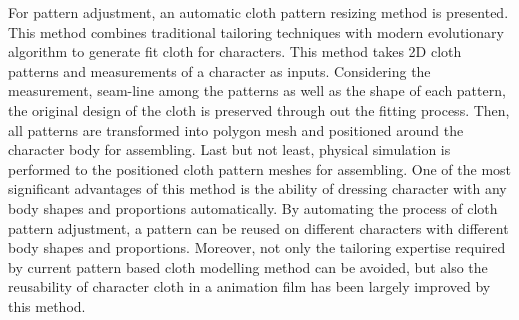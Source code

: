 For pattern adjustment, an automatic cloth pattern resizing method is presented. This method combines traditional tailoring techniques with modern evolutionary algorithm to generate fit cloth for characters. This method takes 2D cloth patterns and measurements of a character as inputs. Considering the measurement, seam-line among the patterns as well as the shape of each pattern, the original design of the cloth is preserved through out the fitting process. Then, all patterns are transformed into polygon mesh and positioned around the character body for assembling. Last but not least, physical simulation is performed to the positioned cloth pattern meshes for assembling. One of the most significant advantages of this method is the ability of dressing character with any body shapes and proportions automatically. By automating the process of cloth pattern adjustment, a pattern can be reused on different characters with different body shapes and proportions. Moreover, not only the tailoring expertise required by current pattern based cloth modelling method can be avoided, but also the reusability of character cloth in a animation film has been largely improved by this method.

